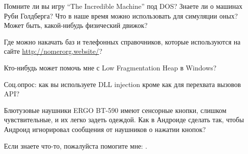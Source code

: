 \myhrule{}

Помните ли вы игру ``The Incredible Machine'' под DOS?
Знаете ли о машинах Руби Голдберга?
Что в наше время можно использовать для симуляции оных?
Может быть, какой-нибудь физический движок?

\myhrule{}

Где можно накачать баз и телефонных справочников, которые используются на сайте \url{http://nomerorg.website/}?

\myhrule{}

Кто-нибудь может помочь мне с Low Fragmentation Heap в Windows?

\myhrule{}

Соц.опрос: как вы используете DLL injection кроме как для перехвата вызовов API?

\myhrule{}

Блютузовые наушники ERGO BT-590 имеют сенсорные кнопки, слишком чувствительные, и их легко задеть одеждой.
Как в Андроиде сделать так, чтобы Андроид игнорировал сообщения от наушников о нажатии кнопок?

\myhrule{}

Если знаете что-то, пожалуйста помогите мне: \EMAILS{}.

